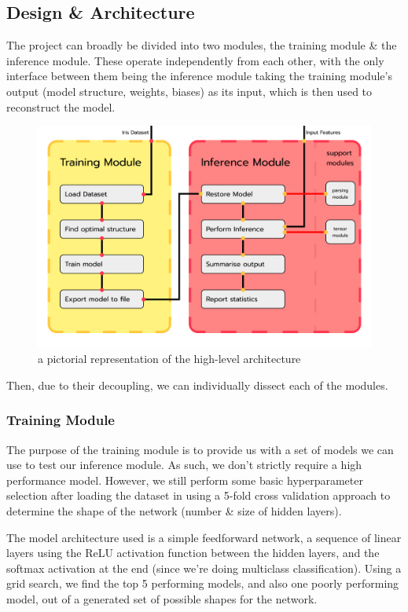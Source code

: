 \documentclass[12pt]{article}
\begin{document}
\subsection{Design \& Architecture}
The project can broadly be divided into two modules, the training module \& the inference module. These operate independently from each other, with the only interface between them being the inference module taking the training module's output (model structure, weights, biases) as its input, which is then used to reconstruct the model.

\newpage
\begin{figure}
	\includegraphics[width=0.85\pdfpagewidth]{../images/modules.png}
	\caption{a pictorial representation of the high-level architecture}
\end{figure}

Then, due to their decoupling, we can individually dissect each of the modules.

\subsubsection{Training Module}
The purpose of the training module is to provide us with a set of models we can use to test our inference module. As such, we don't strictly require a high performance model. However, we still perform some basic hyperparameter selection after loading the dataset in using a 5-fold cross validation approach to determine the shape of the network (number \& size of hidden layers).\bigskip

The model architecture used is a simple feedforward network, a sequence of linear layers using the ReLU activation function between the hidden layers, and the softmax activation at the end (since we're doing multiclass classification). Using a grid search, we find the top 5 performing models, and also one poorly performing model, out of a generated set of possible shapes for the network.\bigskip
\end{document}
